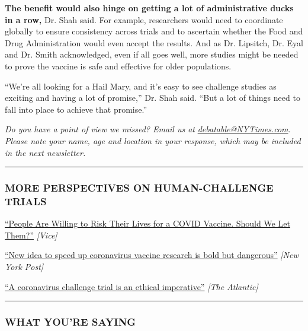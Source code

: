 \textbf{The benefit would also hinge on getting a lot of administrative
ducks in a row,} Dr. Shah said. For example, researchers would need to
coordinate globally to ensure consistency across trials and to ascertain
whether the Food and Drug Administration would even accept the results.
And as Dr. Lipsitch, Dr. Eyal and Dr. Smith acknowledged, even if all
goes well, more studies might be needed to prove the vaccine is safe and
effective for older populations.

``We're all looking for a Hail Mary, and it's easy to see challenge
studies as exciting and having a lot of promise,'' Dr. Shah said. ``But
a lot of things need to fall into place to achieve that promise.''

\emph{Do you have a point of view we missed? Email us at}
\href{mailto:debatable@NYTimes.com}{\emph{debatable@NYTimes.com}}\emph{.
Please note your name, age and location in your response, which may be
included in the next newsletter.}

\begin{center}\rule{0.5\linewidth}{\linethickness}\end{center}

\hypertarget{more-perspectives-on-human-challenge-trials}{%
\subsubsection{MORE PERSPECTIVES ON HUMAN-CHALLENGE
TRIALS}\label{more-perspectives-on-human-challenge-trials}}

\href{https://www.vice.com/en_us/article/5dm7na/why-intentionally-infecting-people-with-coronavirus-could-be-worth-it}{``People
Are Willing to Risk Their Lives for a COVID Vaccine. Should We Let
Them?''} \emph{{[}Vice{]}}

\href{https://nypost.com/2020/04/27/new-idea-to-speed-up-coronavirus-vaccine-research-is-bold-but-dangerous/}{``New
idea to speed up coronavirus vaccine research is bold but dangerous''}
\emph{{[}New York Post{]}}

\href{https://www.theatlantic.com/ideas/archive/2020/04/challenge-trial-ethical-imperative/610309/}{``A
coronavirus challenge trial is an ethical imperative''} \emph{{[}The
Atlantic{]}}

\begin{center}\rule{0.5\linewidth}{\linethickness}\end{center}

\hypertarget{what-youre-saying}{%
\subsubsection{WHAT YOU'RE SAYING}\label{what-youre-saying}}

